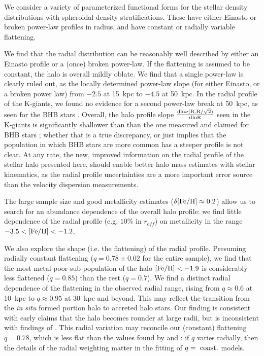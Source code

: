 \documentclass[12pt,preprint]{aastex}
\newcommand{\feh}{{\rm [Fe/H]}}
\begin{document}
We consider a variety of parameterized functional forms for the stellar density distributions
with spheroidal density stratifications. These have either  Einasto or broken power-law profiles 
in radius, and have constant or radially variable flattening. 

We find that the radial distribution can be reasonably well described by either an Einasto profile or a (once) broken power-law. If the flattening is assumed to be constant, the halo is overall mildly oblate. We find that a single power-law is clearly ruled out, as the locally determined power-law slope (for either Einasto, or a broken power law) from $-2.5$ at 15~kpc to $-4.5$ at 50~kpc. In the radial profile of the K-giants, we found no evidence for a second power-law break at 50~kpc, as seen for the BHB stars \citep{Deason2014}. Overall, the halo profile slope
$\rm \frac{dln\nu(R,R/\sqrt{2})}{dlnR}$ seen in the K-giants is significantly shallower than than the one measured and claimed for BHB stars \citep{Deason2014}; whether that is a true discrepancy, or just implies that the population in which BHB stars are more common has 
a steeper profile is not clear.  At any rate, the new, improved information on the radial profile of the stellar halo presented here, should enable better halo mass estimates with stellar kinematics, as the radial profile uncertainties are a more important error source than the velocity dispersion measurements. 

The large sample size and good metallicity estimates ($\delta\feh \approx 0.2$) allow us to 
search for an abundance dependence of the overall halo profile: we find little dependence of the radial profile (e.g. $10\%$ in $r_{eff}$) on metallicity in the range
$\rm -3.5<\feh<-1.2$. 

We also explore the shape (i.e. the flattening) of the radial profile. Presuming radially constant flattening ($q=0.78\pm 0.02$ for the entire sample), we find that the most metal-poor sub-population of the halo $\feh<-1.9$ is considerably less flattened ($q=0.85$) than the rest ($q=0.7$).
We find a distinct radial dependence of the flattening in the observed radial 
range, rising from $q\approx 0.6$ at 10~kpc to $q\approx 0.95$ at 30~kpc and beyond. 
This may reflect the transition from  the \textit{in situ} formed portion halo to accreted halo stars.
Our finding is consistent with early claims \citet{Preston1991} that the halo becomes rounder 
at large radii, but is inconsistent with findings of \citet{Sluis1998, Sesar2011,Deason2011}.
This radial variation may reconcile our (constant) flattening $q=0.78$,
which is less flat than the values found by \citet[;q=0.7]{Sesar2011} 
and \citet[;q=0.58]{Deason2011} : if $q$ varies radially, then the details of the radial weighting matter in the fitting of $q=~\rm const.$ models.
\end{document}
